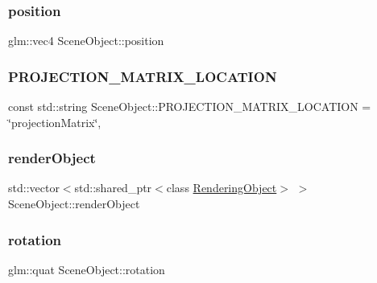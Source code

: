 \subsubsection{\texorpdfstring{position}{position}}
{\footnotesize\ttfamily glm\+::vec4 Scene\+Object\+::position\hspace{0.3cm}{\ttfamily [protected]}}

\hypertarget{class_scene_object_ad9a8c9c39a4a262c5e379c0bda184541}{}\label{class_scene_object_ad9a8c9c39a4a262c5e379c0bda184541} 
\subsubsection{\texorpdfstring{P\+R\+O\+J\+E\+C\+T\+I\+O\+N\+\_\+\+M\+A\+T\+R\+I\+X\+\_\+\+L\+O\+C\+A\+T\+I\+ON}{PROJECTION\_MATRIX\_LOCATION}}
{\footnotesize\ttfamily const std\+::string Scene\+Object\+::\+P\+R\+O\+J\+E\+C\+T\+I\+O\+N\+\_\+\+M\+A\+T\+R\+I\+X\+\_\+\+L\+O\+C\+A\+T\+I\+ON = \char`\"{}projection\+Matrix\char`\"{}\hspace{0.3cm}{\ttfamily [static]}, {\ttfamily [protected]}}

\hypertarget{class_scene_object_a4bbf98a19bd8e7ddd491fbb9a41b42cf}{}\label{class_scene_object_a4bbf98a19bd8e7ddd491fbb9a41b42cf} 
\subsubsection{\texorpdfstring{render\+Object}{renderObject}}
{\footnotesize\ttfamily std\+::vector$<$std\+::shared\+\_\+ptr$<$class \hyperlink{class_rendering_object}{Rendering\+Object}$>$ $>$ Scene\+Object\+::render\+Object\hspace{0.3cm}{\ttfamily [private]}}

\hypertarget{class_scene_object_ae27376aaca87543a75b5a2cd0daf6e2f}{}\label{class_scene_object_ae27376aaca87543a75b5a2cd0daf6e2f} 
\subsubsection{\texorpdfstring{rotation}{rotation}}
{\footnotesize\ttfamily glm\+::quat Scene\+Object\+::rotation\hspace{0.3cm}{\ttfamily [protected]}}

